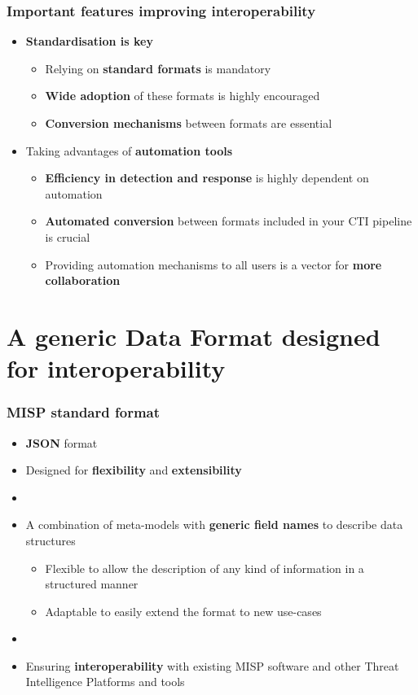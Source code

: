 \begin{frame}
    \frametitle{Important features improving interoperability}
    \begin{itemize}
        \item \textbf{Standardisation is key}
        \begin{itemize}
            \item Relying on \textbf{standard formats} is mandatory
            \item \textbf{Wide adoption} of these formats is highly encouraged
            \item \textbf{Conversion mechanisms} between formats are essential
        \end{itemize}
        \item Taking advantages of \textbf{automation tools}
        \begin{itemize}
            \item \textbf{Efficiency in detection and response} is highly dependent on automation
            \item \textbf{Automated conversion} between formats included in your CTI pipeline is crucial
            \item Providing automation mechanisms to all users is a vector for \textbf{more collaboration}
        \end{itemize}
    \end{itemize}
\end{frame}

\section{A generic Data Format designed for interoperability}

\begin{frame}
    \frametitle{MISP standard format}
    \begin{itemize}
        \item \textbf{JSON} format
        \item Designed for \textbf{flexibility} and \textbf{extensibility}
        \item []
        \item A combination of meta-models with \textbf{generic field names} to describe data structures
        \begin{itemize}
            \item Flexible to allow the description of any kind of information in a structured manner
            \item Adaptable to easily extend the format to new use-cases
        \end{itemize}
        \item []
        \item Ensuring \textbf{interoperability} with existing MISP software and other Threat Intelligence Platforms and tools
    \end{itemize}
\end{frame}

